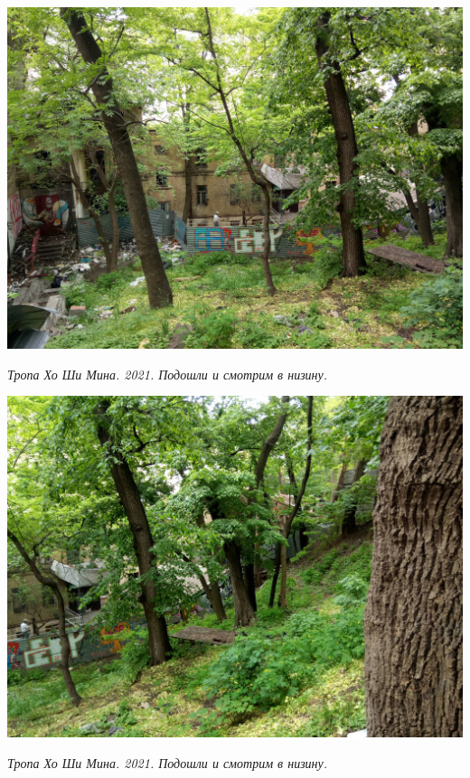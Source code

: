 \begin{center}
\includegraphics[width=\linewidth]{rpix/IMG_20210601_134940.jpg}

\textit{Тропа Хо Ши Мина. 2021. Подошли и смотрим в низину.}
\end{center}



\begin{center}
\includegraphics[width=\linewidth]{rpix/IMG_20210601_134942.jpg}

\textit{Тропа Хо Ши Мина. 2021. Подошли и смотрим в низину.}
\end{center}



